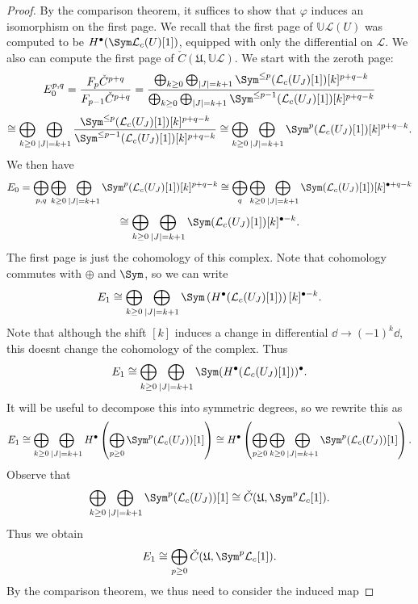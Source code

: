 \begin{proof}
	By the comparison theorem, it suffices to show that $\varphi $ induces an isomorphism on the first page. We recall that the first page of $\mathbb{U} \mathcal{L}(U)$ was computed to be $H^{\bullet} (\Sym \mathcal{L} _c(U)[1])$, equipped with only the differential on $\mathcal{L}$. We also can compute the first page of $\check{C}(\mathfrak{U} ,\mathbb{U} \mathcal{L} )$. We start with the zeroth page:
	\[
		E^{p,q}_0 = \frac{F_p\check{C}^{p+q} }{F_{p-1} \check{C}^{p+q} } =\frac{\bigoplus_{k\geq 0} \bigoplus_{\left| J \right| =k+1} \Sym ^{\leq p} (\mathcal{L} _c(U_J)[1])[k]^{p+q-k} }{\bigoplus_{k\geq 0} \bigoplus_{\left| J \right| =k+1} \Sym ^{\leq p-1} (\mathcal{L} _c(U_J)[1])[k]^{p+q-k} } 
	\]
	\[
		\cong \bigoplus_{k\geq 0} \bigoplus_{\left| J \right| =k+1} \frac{\Sym ^{\leq p} (\mathcal{L} _c(U_J)[1])[k]^{p+q-k} }{\Sym ^{\leq p-1} (\mathcal{L} _c(U_J)[1])[k]^{p+q-k} } \cong \bigoplus_{k\geq 0} \bigoplus_{\left| J \right| =k+1} \Sym ^{p} (\mathcal{L} _c(U_J)[1])[k]^{p+q-k} 
	.\]
	We then have
	\[
		E_0 = \bigoplus_{p,q} \bigoplus_{k\geq 0} \bigoplus_{\left| J \right| =k+1} \Sym ^p(\mathcal{L} _c(U_J)[1])[k]^{p+q-k} \cong \bigoplus_{q} \bigoplus_{k\geq 0} \bigoplus_{\left| J \right| =k+1} \Sym (\mathcal{L} _c(U_J)[1])[k]^{\bullet+q-k} 
	\]
	\[
		\cong \bigoplus_{k\geq 0} \bigoplus_{\left| J \right|=k+1} \Sym (\mathcal{L} _c(U_J)[1])[k]^{\bullet-k} 
	.\]
	The first page is just the cohomology of this complex. Note that cohomology commutes with $\oplus $ and $\Sym $, so we can write
	\[
		E_1 \cong \bigoplus_{k\geq 0} \bigoplus_{\left| J \right| =k+1} \Sym \left( H^{\bullet} (\mathcal{L} _c(U_J)[1]) \right) [k]^{\bullet-k} 
	.\]
	Note that although the shift $[k]$ induces a change in differential $\dd \to  (-1)^k\dd $, this doesnt change the cohomology of the complex. Thus
	\[
		E_1 \cong \bigoplus_{k\geq 0} \bigoplus_{\left| J \right| =k+1} \Sym (H^{\bullet} (\mathcal{L} _c(U_J)[1]))^{\bullet} 
	.\]
	It will be useful to decompose this into symmetric degrees, so we rewrite this as
	\[
		E_1 \cong \bigoplus_{k\geq 0} \bigoplus_{\left| J \right| =k+1} H^{\bullet} \left( \bigoplus_{p\geq 0} \Sym ^p(\mathcal{L} _c(U_J))[1] \right)\cong H^{\bullet} \left( \bigoplus_{p\geq 0} \bigoplus_{k\geq 0} \bigoplus_{\left| J \right| =k+1} \Sym ^p(\mathcal{L} _c(U_J))[1] \right) 
	.\]
	Observe that
	\[
		\bigoplus_{k\geq 0}\bigoplus_{\left| J \right| =k+1} \Sym ^p(\mathcal{L}_c(U_J))[1] \cong \check{C}(\mathfrak{U} ,\Sym ^p\mathcal{L} _c[1])
	.\]
	Thus we obtain
	\[
		E_1 \cong \bigoplus_{p\geq 0} \check{C}(\mathfrak{U} ,\Sym ^p\mathcal{L} _c[1])
	.\]
	By the comparison theorem, we thus need to consider the induced map

\end{proof}
